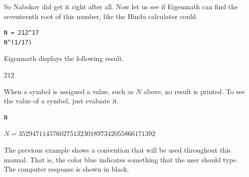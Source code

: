 \bigskip
\noindent
So Nabokov did get it right after all.
Now let us see if Eigenmath can find the
seventeenth root of this number, like the Hindu calculator could.

{\color{blue}
\begin{verbatim}
N = 212^17
N^(1/17)
\end{verbatim}
}

\noindent
Eigenmath displays the following result.

\bigskip
\noindent
$212$

\bigskip
\noindent
When a symbol is assigned a value, such as $N$ above,
no result is printed.
To see the value of a symbol, just evaluate it.

{\color{blue}
\begin{verbatim}
N
\end{verbatim}
}

\noindent
$N=3529471145760275132301897342055866171392$

\bigskip
\noindent
The previous example shows a convention that will be used throughout
this manual.
That is, the color blue indicates something that the user should type.
The computer response is shown in black.
